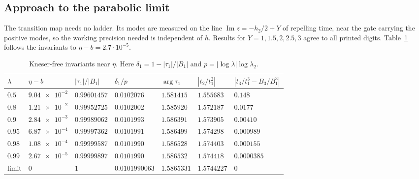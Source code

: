\documentclass[11pt]{amsart}
\theoremstyle{definition}
\begin{document}
\subsection{Approach to the parabolic limit}\label{sec:mode2}
The transition map needs no ladder.  Its modes are measured on the line
$\operatorname{Im}z=-h_2/2+Y$ of repelling time, near the gate carrying the
positive modes, so the working precision needed is independent of $h$.
Results for $Y=1,1.5,2,2.5,3$ agree to all printed digits.
Table~\ref{tab:eta} follows the invariants to $\eta-b=2.7\cdot10^{-5}$.

\begin{table}[htbp]
\centering
\caption{Kneser-free invariants near $\eta$.  Here $\delta_1=1-|\tau_1|/|B_1|$
and $p=|\log\lambda|\log\lambda_2$.}
\label{tab:eta}
\small\setlength{\tabcolsep}{4pt}
\begin{tabular}{lllllll}
\toprule
$\lambda$ & $\eta-b$ & $|\tau_1|/|B_1|$ & $\delta_1/p$ & $\arg\tau_1$ & $|t_2/t_1^2|$ & $|t_3/t_1^3-B_3/B_1^3|$\\
\midrule
$0.5$ & $\num{9.04e-2}$ & $0.99601457$ & $0.0102076$ & $1.581415$ & $1.555683$ & $0.148$\\
$0.8$ & $\num{1.21e-2}$ & $0.99952725$ & $0.0102002$ & $1.585920$ & $1.572187$ & $0.0177$\\
$0.9$ & $\num{2.84e-3}$ & $0.99989062$ & $0.0101993$ & $1.586391$ & $1.573905$ & $0.00410$\\
$0.95$ & $\num{6.87e-4}$ & $0.99997362$ & $0.0101991$ & $1.586499$ & $1.574298$ & $0.000989$\\
$0.98$ & $\num{1.08e-4}$ & $0.99999587$ & $0.0101990$ & $1.586528$ & $1.574403$ & $0.000155$\\
$0.99$ & $\num{2.67e-5}$ & $0.99999897$ & $0.0101990$ & $1.586532$ & $1.574418$ & $0.0000385$\\
\midrule
limit & $0$ & $1$ & $0.0101990063$ & $1.5865331$ & $1.5744227$ & $0$\\
\bottomrule
\end{tabular}
\end{table}
\end{document}
